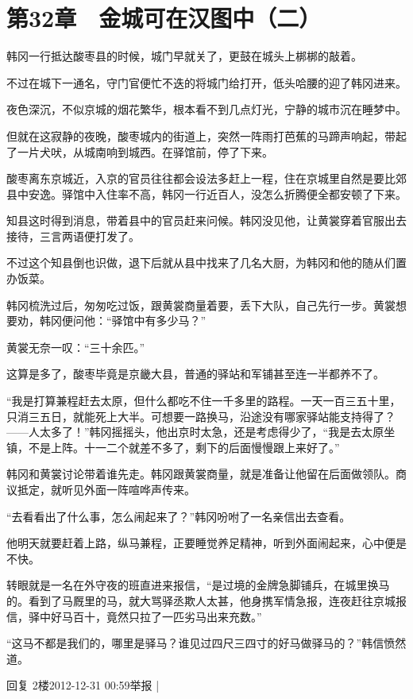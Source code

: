 \section{第32章　金城可在汉图中（二）}

韩冈一行抵达酸枣县的时候，城门早就关了，更鼓在城头上梆梆的敲着。 

不过在城下一通名，守门官便忙不迭的将城门给打开，低头哈腰的迎了韩冈进来。 

夜色深沉，不似京城的烟花繁华，根本看不到几点灯光，宁静的城市沉在睡梦中。 

但就在这寂静的夜晚，酸枣城内的街道上，突然一阵雨打芭蕉的马蹄声响起，带起了一片犬吠，从城南响到城西。在驿馆前，停了下来。 

酸枣离东京城近，入京的官员往往都会设法多赶上一程，住在京城里自然是要比郊县中安逸。驿馆中入住率不高，韩冈一行近百人，没怎么折腾便全都安顿了下来。 

知县这时得到消息，带着县中的官员赶来问候。韩冈没见他，让黄裳穿着官服出去接待，三言两语便打发了。 

不过这个知县倒也识做，退下后就从县中找来了几名大厨，为韩冈和他的随从们置办饭菜。

韩冈梳洗过后，匆匆吃过饭，跟黄裳商量着要，丢下大队，自己先行一步。黄裳想要劝，韩冈便问他：“驿馆中有多少马？” 

黄裳无奈一叹：“三十余匹。” 

这算是多了，酸枣毕竟是京畿大县，普通的驿站和军铺甚至连一半都养不了。 

“我是打算兼程赶去太原，但什么都吃不住一千多里的路程。一天一百三五十里，只消三五日，就能死上大半。可想要一路换马，沿途没有哪家驿站能支持得了？——人太多了！”韩冈摇摇头，他出京时太急，还是考虑得少了，“我是去太原坐镇，不是上阵。十一二个就差不多了，剩下的后面慢慢跟上来好了。” 

韩冈和黄裳讨论带着谁先走。韩冈跟黄裳商量，就是准备让他留在后面做领队。商议抵定，就听见外面一阵喧哗声传来。 

“去看看出了什么事，怎么闹起来了？”韩冈吩咐了一名亲信出去查看。 

他明天就要赶着上路，纵马兼程，正要睡觉养足精神，听到外面闹起来，心中便是不快。 

转眼就是一名在外守夜的班直进来报信，“是过境的金牌急脚铺兵，在城里换马的。看到了马厩里的马，就大骂驿丞欺人太甚，他身携军情急报，连夜赶往京城报信，驿中好马百十，竟然只拉了一匹劣马出来充数。” 

“这马不都是我们的，哪里是驿马？谁见过四尺三四寸的好马做驿马的？”韩信愤然道。 

回复 2楼2012-12-31 00:59举报 |

